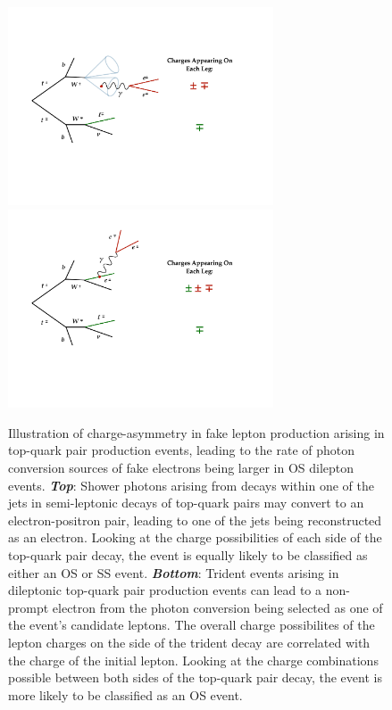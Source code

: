 \begin{figure}[!htb]
    \begin{center}
        \includegraphics[width=0.7\textwidth]{figures/common_ana/fakes/ttbar_fake_charge_sym_semi}
        \includegraphics[width=0.7\textwidth]{figures/common_ana/fakes/ttbar_fake_charge_sym_trident}
        \caption{
            Illustration of charge-asymmetry in fake lepton production
            arising in top-quark pair production events, leading to
            the rate of photon conversion sources of fake electrons being larger in OS dilepton events.
            \textbf{\textit{Top}}: Shower photons arising from decays within one of the jets
                in semi-leptonic decays of top-quark pairs may convert to an electron-positron pair,
                leading to one of the jets being reconstructed as an electron.
                Looking at the charge possibilities of each side of the top-quark pair decay,
                the event is equally likely to be classified as either an OS or SS event.
            \textbf{\textit{Bottom}}: Trident events arising in dileptonic top-quark pair production
                events can lead to a non-prompt electron from the photon conversion being selected
                as one of the event's candidate leptons.
                The overall charge possibilites of the lepton charges on the side of the trident decay
                are correlated with the charge of the initial lepton.
                Looking at the charge combinations possible between both sides of the top-quark pair decay,
                the event is more likely to be classified as an OS event.
        }
        \label{fig:ttbar_fake_charge_sym}
    \end{center}
\end{figure}


